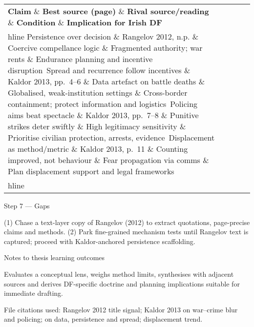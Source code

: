  
\begin{tabular}{p{3.2cm}p{4.2cm}p{3.6cm}p{3.2cm}p{4.2cm}}
	\textbf{Claim} \& \textbf{Best source (page)} \& \textbf{Rival source/reading} \& \textbf{Condition} \& \textbf{Implication for Irish DF}\\hline
	Persistence over decision \& Rangelov 2012, n.p. \& Coercive compellance logic \& Fragmented authority; war rents \& Endurance planning and incentive disruption\
	Spread and recurrence follow incentives \& Kaldor 2013, pp.~4–6 \& Data artefact on battle deaths \& Globalised, weak-institution settings \& Cross-border containment; protect information and logistics\
	Policing aims beat spectacle \& Kaldor 2013, pp.~7–8 \& Punitive strikes deter swiftly \& High legitimacy sensitivity \& Prioritise civilian protection, arrests, evidence\
	Displacement as method/metric \& Kaldor 2013, p.~11 \& Counting improved, not behaviour \& Fear propagation via comms \& Plan displacement support and legal frameworks\\hline
\end{tabular}

Step 7 — Gaps

(1) Chase a text-layer copy of Rangelov (2012) to extract quotations, page-precise claims and methods.
(2) Park fine-grained mechanism tests until Rangelov text is captured; proceed with Kaldor-anchored persistence scaffolding.

Notes to thesis learning outcomes

Evaluates a conceptual lens, weighs method limits, synthesises with adjacent sources and derives DF-specific doctrine and planning implications suitable for immediate drafting.

File citations used: Rangelov 2012 title signal; Kaldor 2013 on war–crime blur and policing; on data, persistence and spread; displacement trend.

\parencite{UKLP_2023}

